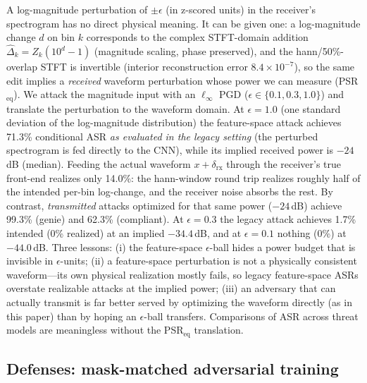 \documentclass[review]{elsarticle}
\begin{document}
A log-magnitude perturbation of $\pm\epsilon$ (in z-scored units) in the
receiver's spectrogram has no direct physical meaning. It can be given one:
a log-magnitude change $d$ on bin $k$ corresponds to the complex STFT-domain
addition $\hat{\Delta}_k = \hat{Z}_k (10^{d} - 1)$ (magnitude scaling, phase
preserved), and the hann/50\%-overlap STFT is invertible (interior
reconstruction error $8.4\times10^{-7}$), so the same edit implies a
\emph{received} waveform perturbation whose power we can measure
(PSR$_{\mathrm{eq}}$). We attack the magnitude input with an
$\ell_\infty$ PGD ($\epsilon \in \{0.1, 0.3, 1.0\}$) and translate the
perturbation to the waveform domain. At $\epsilon = 1.0$ (one standard
deviation of the log-magnitude distribution) the feature-space attack
achieves 71.3\% conditional ASR \emph{as evaluated in the legacy setting}
(the perturbed spectrogram is fed directly to the CNN), while its implied
received power is $-24$\,dB (median). Feeding the actual waveform
$x + \delta_{\mathrm{rx}}$ through the receiver's true front-end realizes
only 14.0\%: the hann-window round trip realizes roughly half of the
intended per-bin log-change, and the receiver noise absorbs the rest. By
contrast, \emph{transmitted} attacks optimized for that same power
($-24$\,dB) achieve 99.3\% (genie) and 62.3\% (compliant). At
$\epsilon = 0.3$ the legacy attack achieves 1.7\% intended (0\%
realized) at an implied $-34.4$\,dB, and at $\epsilon = 0.1$ nothing
(0\%) at $-44.0$\,dB. Three lessons: (i) the
feature-space $\epsilon$-ball hides a power budget that is invisible in
$\epsilon$-units; (ii) a feature-space perturbation is not a physically
consistent waveform---its own physical realization mostly fails, so legacy
feature-space ASRs overstate realizable attacks at the implied power;
(iii) an adversary that can actually transmit is far better served by
optimizing the waveform directly (as in this paper) than by hoping an
$\epsilon$-ball transfers. Comparisons of ASR across threat models are
meaningless without the PSR$_{\mathrm{eq}}$ translation.

\subsection{Defenses: mask-matched adversarial training}
\label{sec:defenses}
\end{document}
